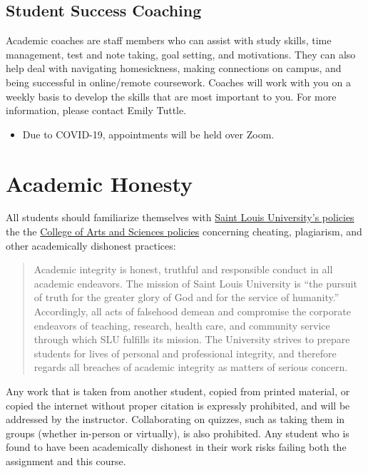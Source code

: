 \documentclass[
]{book}
\newenvironment{rmdblock}[1]
  {\begin{shaded*}
  \begin{itemize}
  \renewcommand{\labelitemi}{
    \raisebox{-.7\height}[0pt][0pt]{
      {\setkeys{Gin}{width=3em,keepaspectratio}\texttt{[image: images/\#1]}}
    }
  }
  \item
  }
  {
  \end{itemize}
  \end{shaded*}
  }
\newenvironment{rmdnote}
  {\begin{rmdblock}{note}}
  {\end{rmdblock}}
\begin{document}
\hypertarget{student-success-coaching}{%
\subsection{Student Success Coaching}\label{student-success-coaching}}

Academic coaches are staff members who can assist with study skills, time management, test and note taking, goal setting, and motivations. They can also help deal with navigating homesickness, making connections on campus, and being successful in online/remote coursework. Coaches will work with you on a weekly basis to develop the skills that are most important to you. For more information, please contact Emily Tuttle.

\begin{rmdnote}
Due to COVID-19, appointments will be held over Zoom.
\end{rmdnote}

\hypertarget{academic-honesty}{%
\section{Academic Honesty}\label{academic-honesty}}

All students should familiarize themselves with \href{https://www.slu.edu/provost/policies/academic-and-course/policy_academic-integrity_6-26-2015.pdf}{Saint Louis University's policies} the the \href{https://www.slu.edu/arts-and-sciences/student-resources/academic-honesty.php}{College of Arts and Sciences policies} concerning cheating, plagiarism, and other academically dishonest practices:

\begin{quote}
Academic integrity is honest, truthful and responsible conduct in all academic endeavors. The mission of Saint Louis University is ``the pursuit of truth for the greater glory of God and for the service of humanity.'' Accordingly, all acts of falsehood demean and compromise the corporate endeavors of teaching, research, health care, and community service through which SLU fulfills its mission. The University strives to prepare students for lives of personal and professional integrity, and therefore regards all breaches of academic integrity as matters of serious concern.
\end{quote}

Any work that is taken from another student, copied from printed material, or copied the internet without proper citation is expressly prohibited, and will be addressed by the instructor. Collaborating on quizzes, such as taking them in groups (whether in-person or virtually), is also prohibited. Any student who is found to have been academically dishonest in their work risks failing both the assignment and this course.
\end{document}
